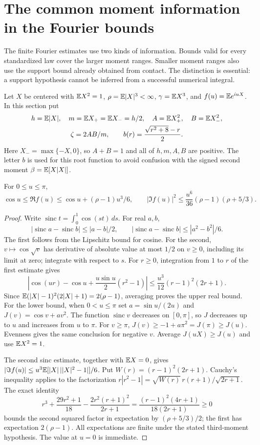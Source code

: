 \section{The common moment information in the Fourier bounds}
\label{ext:fourier-moments}
The finite Fourier estimates use two kinds of information. Bounds valid for
every standardized law cover the larger moment ranges. Smaller moment ranges
also use the support bound already obtained from contact. The distinction is
essential: a support hypothesis cannot be inferred from a successful numerical
integral.

Let $X$ be centered with $\mathbb E X^2=1$, $\rho=\mathbb E|X|^3<\infty$,
$\gamma=\mathbb E X^3$, and $f(u)=\mathbb E e^{iuX}$. In this section put
\[
 \begin{gathered}
 h=\mathbb E|X|,\quad m=\mathbb E X_+=\mathbb E X_-=h/2,\quad
 A=\mathbb E X_+^2,\quad B=\mathbb E X_-^2,\\
 \zeta=2AB/m,\qquad b(r)=\frac{\sqrt{r^2+8}-r}{2}.
 \end{gathered}
\]
Here $X_-=\max\{-X,0\}$, so $A+B=1$ and all of $h,m,A,B$ are
positive. The letter $b$ is used for this root function to avoid confusion
with the signed second moment $\beta=\mathbb E[X|X|]$.

\begin{lemma}\label{ext:fourier-anchor}
For $0\le u\le\pi$,
\[
 \cos u\le\Re f(u)\le\cos u+(\rho-1)u^3/6,
 \qquad
 |\Im f(u)|^2\le\frac{u^6}{36}(\rho-1)(\rho+5/3).
\]
\end{lemma}
\begin{proof}
Write $\operatorname{sinc}t=\int_0^1\cos(st)\,ds$. For real $a,b$,
\[
 |\operatorname{sinc}a-\operatorname{sinc}b|
 \le |a-b|/2,\qquad
 |\operatorname{sinc}a-\operatorname{sinc}b|
 \le |a^2-b^2|/6.
\]
The first follows from the Lipschitz bound for cosine. For the second,
$v\mapsto\cos\sqrt v$ has derivative of absolute value at most $1/2$
on $v\ge0$, including its limit at zero; integrate with respect to $s$.
For $r\ge0$, integration from $1$ to $r$ of the first estimate gives
\[
 \left|\cos(ur)-\cos u+\frac{u\sin u}{2}(r^2-1)\right|
 \le \frac{u^3}{12}(r-1)^2(2r+1).
\]
Since $\mathbb E(|X|-1)^2(2|X|+1)=2(\rho-1)$, averaging proves the
upper real bound. For the lower bound, when $0<u\le\pi$ set
$a=\sin u/(2u)$ and $J(v)=\cos v+av^2$. The function
$\operatorname{sinc}v$ decreases on $[0,\pi]$, so $J$ decreases up to
$u$ and increases from $u$ to $\pi$. For $v\ge\pi$,
$J(v)\ge-1+a\pi^2=J(\pi)\ge J(u)$. Evenness gives the same conclusion
for negative $v$. Average $J(uX)\ge J(u)$ and use $\mathbb E X^2=1$.

The second sinc estimate, together with $\mathbb E X=0$, gives
$|\Im f(u)|\le u^3\mathbb E[|X|\,||X|^2-1|]/6$.
Put $W(r)=(r-1)^2(2r+1)$. Cauchy's inequality applies to the factorization
$r|r^2-1|=\sqrt{W(r)}\,r(r+1)/\sqrt{2r+1}$.
The exact identity
\[
 r^3+\frac{29r^2+1}{18}
 -\frac{2r^2(r+1)^2}{2r+1}
 =\frac{(r-1)^2(4r+1)}{18(2r+1)}\ge0
\]
bounds the second squared factor in expectation by $(\rho+5/3)/2$;
the first has expectation $2(\rho-1)$. All expectations are finite under
the stated third-moment hypothesis. The value at $u=0$ is immediate.
\end{proof}

